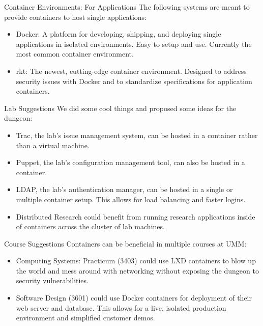 \documentclass[xcolor=dvipsnames,aspectratio=1610]{beamer}
\begin{document}
  \begin{frame}{Container Environments: For Applications}
      The following systems are meant to provide containers to host single applications: \newline
      \begin{itemize}
          \setlength\itemsep{1.6em}
          \item \alert{Docker}: A platform for developing, shipping, and deploying single applications in isolated environments. Easy to setup and use. Currently the most common container environment.
          \item \alert{rkt}: The newest, cutting-edge container environment. Designed to address security issues with Docker and to standardize specifications for application containers.
      \end{itemize}
  \end{frame}

  \begin{frame}{Lab Suggestions}
      We did some cool things and proposed some ideas for the dungeon:
      \begin{itemize}
          \item \alert{Trac}, the lab's issue management system, can be hosted in a container rather than a virtual machine.
          \item \alert{Puppet}, the lab's configuration management tool, can also be hosted in a container.
          \item \alert{LDAP}, the lab's authentication manager, can be hosted in a single or multiple container setup. This allows for load balancing and faster logins.
          \item \alert{Distributed Research} could benefit from running research applications inside of containers across the cluster of lab machines.
      \end{itemize}
  \end{frame}

  \begin{frame}{Course Suggestions}
      Containers can be beneficial in multiple courses at UMM:
      \begin{itemize}
          \item \alert{Computing Systems: Practicum} (3403) could use LXD containers to blow up the world and mess around with networking without exposing the dungeon to security vulnerabilities.
          \item \alert{Software Design} (3601) could use Docker containers for deployment of their web server and database. This allows for a live, isolated production environment and simplified customer demos.
      \end{itemize}
  \end{frame}
\end{document}
